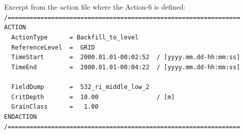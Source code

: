 \newpage
Excerpt from the action file where the Action-6 is defined:
\\ \hspace*{3mm} \texttt{\small{/================================================================}}
\\ \hspace*{3mm} \texttt{\small{ACTION}}
\\ \hspace*{3mm} \texttt{\small{~~ActionType~~~~~~=~Backfill\_to\_level}}
\\ \hspace*{3mm} \texttt{\small{~~ReferenceLevel~~=~~GRID}}
\\ \hspace*{3mm} \texttt{\small{~~TimeStart~~~~~~~=~~2000.01.01-00:02:52~~/~[yyyy.mm.dd-hh:mm:ss]}}
\\ \hspace*{3mm} \texttt{\small{~~TimeEnd ~~~~~~~~=~~2000.01.01-00:04:22~~/~[yyyy.mm.dd-hh:mm:ss]}}
\\ \hspace*{3mm}
\\ \hspace*{3mm} \texttt{\small{~~FieldDump~~~~~~~=~~532\_ri\_middle\_low\_2}}
\\ \hspace*{3mm} \texttt{\small{~~CritDepth~~~~~~~=~~10.00~~~~~~~~~~~~~~~~/~[m]}}
\\ \hspace*{3mm} \texttt{\small{~~GrainClass~~~~~~=~~~1.00}}
\\ \hspace*{3mm} \texttt{\small{ENDACTION}}
\\ \hspace*{3mm} \texttt{\small{/================================================================}}




